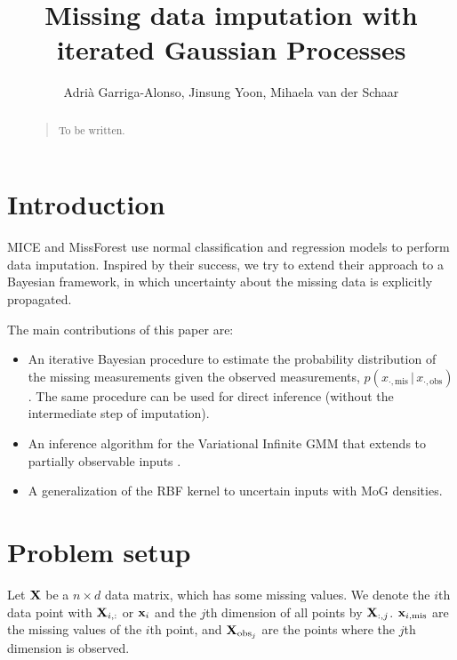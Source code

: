 \documentclass[letterpaper]{article}
\title{Missing data imputation with iterated Gaussian Processes}
\author{Adrià Garriga-Alonso, Jinsung Yoon, Mihaela van der Schaar}
\newcommand{\vbar}{\,|\,}
\newcommand{\vx}{{\bf x}}
\newcommand{\vX}{{\bf X}}
\begin{document}
\nocopyright
\maketitle

\begin{abstract}
\begin{quote}
  To be written.
\end{quote}
\end{abstract}

\section{Introduction}


\ac{MICE} \citep{van1999flexible} and MissForest
\citep{stekhoven2011missforest} use normal classification and regression models
to perform data imputation. Inspired by their success, we try to extend their approach to
a Bayesian framework, in which uncertainty about the missing data is explicitly
propagated.

The main contributions of this paper are:
\begin{itemize}
\item An iterative Bayesian procedure to estimate the probability distribution
of the missing measurements given the observed measurements,
$p(x_{\cdot,\text{mis}}\vbar x_{\cdot,\text{obs}})$. The same procedure can be used for direct
inference (without the intermediate step of imputation).

\item An inference algorithm for the Variational Infinite GMM
 \citep{blei2006variational,BishopChristopherM2006Pram} that extends to
partially observable inputs \citep{DIZIO20075305}.

\item A generalization of the \acs{RBF} kernel to uncertain inputs with \ac{MoG}
densities.

\end{itemize}
\section{Problem setup}
Let $\bf X$ be a $n \times d$ data matrix, which has some missing values.
We denote the $i$th data point with ${\bf X}_{i,:}$ or $\vx_i$ and the $j$th
dimension of all points by ${\bf X}_{:,j}$. $\vx_{i,\text{mis}}$ are the missing
values of the $i$th point, and $\vX_{\text{obs}_j}$ are the points where the
$j$th dimension is observed.
\end{document}
